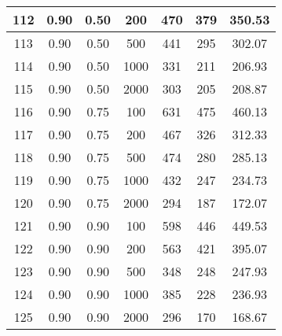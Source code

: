 \documentclass[a4paper, 12pt, unknownkeysallowed]{extreport}
\begin{document}
\begin{center}
\begin{longtable}[c]{|c|c|c|c|c|c|c|}
 112 & 0.90 & 0.50 &   200 &  470 &  379 & 350.53 \\ \hline
 113 & 0.90 & 0.50 &   500 &  441 &  295 & 302.07 \\ \hline
 114 & 0.90 & 0.50 &  1000 &  331 &  211 & 206.93 \\ \hline
 115 & 0.90 & 0.50 &  2000 &  303 &  205 & 208.87 \\ \hline
 116 & 0.90 & 0.75 &   100 &  631 &  475 & 460.13 \\ \hline
 117 & 0.90 & 0.75 &   200 &  467 &  326 & 312.33 \\ \hline
 118 & 0.90 & 0.75 &   500 &  474 &  280 & 285.13 \\ \hline
 119 & 0.90 & 0.75 &  1000 &  432 &  247 & 234.73 \\ \hline
 120 & 0.90 & 0.75 &  2000 &  294 &  187 & 172.07 \\ \hline
 121 & 0.90 & 0.90 &   100 &  598 &  446 & 449.53 \\ \hline
 122 & 0.90 & 0.90 &   200 &  563 &  421 & 395.07 \\ \hline
 123 & 0.90 & 0.90 &   500 &  348 &  248 & 247.93 \\ \hline
 124 & 0.90 & 0.90 &  1000 &  385 &  228 & 236.93 \\ \hline
 125 & 0.90 & 0.90 &  2000 &  296 &  170 & 168.67 \\ \hline
  \end{longtable}
\end{center}

\clearpage
\end{document}
